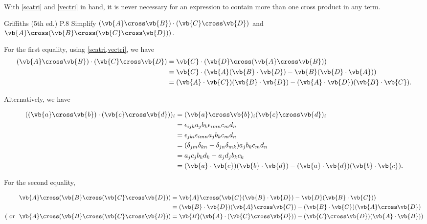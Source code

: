 \documentclass[a4paper,12pt]{report}
\begin{document}
	
With \cref{scatri} and \cref{vectri} in hand, it is never necessary for an expression to contain more than one cross product in any term.
	
\example
{Griffiths (5th ed.) P.8}
{Simplify \((\vb{A} \cross \vb{B}) \cdot (\vb{C} \cross \vb{D})\) and \(\vb{A} \cross (\vb{B} \cross (\vb{C} \cross \vb{D}))\).}
{For the first equality, using \cref{scatri,vectri}, we have 
\begin{equation} 
	\begin{aligned} 
		(\vb{A} \cross \vb{B}) \cdot (\vb{C} \cross \vb{D}) &= \vb{C} \cdot (\vb{D} \cross (\vb{A} \cross \vb{B})) \\ 
			&= \vb{C} \cdot (\vb{A}(\vb{B} \cdot \vb {D}) - \vb{B}(\vb{D} \cdot \vb{A}))  \\
			&= (\vb{A} \cdot \vb{C})(\vb{B} \cdot \vb{D}) - (\vb{A} \cdot \vb{D})(\vb{B} \cdot \vb{C}).
	\end{aligned} 
\end{equation}

Alternatively, we have

\begin{equation}
    \begin{aligned} 
    ((\vb{a} \cross \vb{b} )\cdot (\vb{c} \cross \vb{d} ))_{i} &= (\vb{a} \cross \vb{b} )_{i} (\vb{c} \cross \vb{d} )_{i} \\
    &= \epsilon _{ijk}a_{j} b_{k}\epsilon _{imn}c_{m}d_{n} \\
    &= \epsilon _{jki}\epsilon _{imn} a_{j} b_{k} c_{m} d_{n} \\
    &= (\delta _{jm} \delta _{kn} - \delta _{jn} \delta _{mk} ) a_{j} b_{k} c_{m} d_{n} \\
    &= a_{j} c_{j} b_{k} d_{k} - a_{j} d_{j} b_{k} c_{k} \\
    &= (\vb{a} \cdot \vb{c} )(\vb{b} \cdot \vb{d} ) -  (\vb{a} \cdot \vb{d} )(\vb{b} \cdot \vb{c} ).         
    \end{aligned} 
\end{equation}

For the second equality,

\begin{equation} 
	\begin{aligned} 
		\vb{A} \cross (\vb{B} \cross (\vb{C} \cross \vb{D})) &= \vb{A} \cross(\vb{C}(\vb{B} \cdot \vb{D}) - \vb{D}(\vb{B} \cdot \vb{C}))  \\
			&= (\vb{B} \cdot \vb{D})(\vb{A} \cross \vb{C}) - (\vb{B} \cdot \vb{C})(\vb{A} \cross \vb{D}) \\
			(\text { or }  ~ \vb{A} \cross (\vb{B} \cross (\vb{C} \cross \vb{D})) &= \vb{B}(\vb{A} \cdot (\vb{C} \cross \vb{D})) - (\vb{C} \cross \vb{D})(\vb{A} \cdot \vb{B}))
	\end{aligned} 
\end{equation}}
\end{document}
